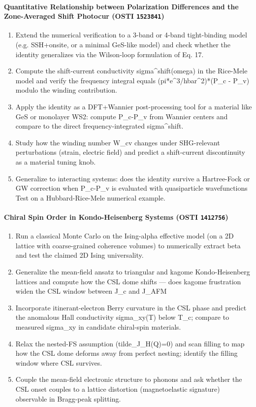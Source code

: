 \paragraph{Quantitative Relationship between Polarization Differences and the Zone-Averaged Shift Photocur \textnormal{\small(OSTI \texttt{1523841})}}
\begin{enumerate}[leftmargin=1.6em,itemsep=0.2em,topsep=0.2em,label=Q\arabic*.]
\item Extend the numerical verification to a 3-band or 4-band tight-binding model (e.g. SSH+onsite, or a minimal GeS-like model) and check whether the identity generalizes via the Wilson-loop formulation of Eq. 17.
\item Compute the shift-current conductivity sigma\textasciicircum{}shift(omega) in the Rice-Mele model and verify the frequency integral equals (pi*e\textasciicircum{}3/hbar\textasciicircum{}2)*(P\_c - P\_v) modulo the winding contribution.
\item Apply the identity as a DFT+Wannier post-processing tool for a material like GeS or monolayer WS2: compute P\_c-P\_v from Wannier centers and compare to the direct frequency-integrated sigma\textasciicircum{}shift.
\item Study how the winding number W\_cv changes under SHG-relevant perturbations (strain, electric field) and predict a shift-current discontinuity as a material tuning knob.
\item Generalize to interacting systems: does the identity survive a Hartree-Fock or GW correction when P\_c-P\_v is evaluated with quasiparticle wavefunctions Test on a Hubbard-Rice-Mele numerical example.
\end{enumerate}
\paragraph{Chiral Spin Order in Kondo-Heisenberg Systems \textnormal{\small(OSTI \texttt{1412756})}}
\begin{enumerate}[leftmargin=1.6em,itemsep=0.2em,topsep=0.2em,label=Q\arabic*.]
\item Run a classical Monte Carlo on the Ising-alpha effective model (on a 2D lattice with coarse-grained coherence volumes) to numerically extract beta and test the claimed 2D Ising universality.
\item Generalize the mean-field ansatz to triangular and kagome Kondo-Heisenberg lattices and compute how the CSL dome shifts --- does kagome frustration widen the CSL window between J\_c and J\_AFM
\item Incorporate itinerant-electron Berry curvature in the CSL phase and predict the anomalous Hall conductivity sigma\_xy(T) below T\_c; compare to measured sigma\_xy in candidate chiral-spin materials.
\item Relax the nested-FS assumption (tilde\_J\_H(Q)=0) and scan filling to map how the CSL dome deforms away from perfect nesting; identify the filling window where CSL survives.
\item Couple the mean-field electronic structure to phonons and ask whether the CSL onset couples to a lattice distortion (magnetoelastic signature) observable in Bragg-peak splitting.
\end{enumerate}
